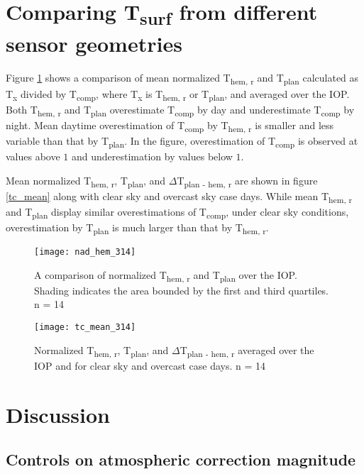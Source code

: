 \begin{bibunit}
\section{Comparing T\textsubscript{surf} from different sensor geometries}

Figure \ref{tc_nadhem} shows a comparison of mean normalized T\textsubscript{hem, r} and T\textsubscript{plan} calculated as T\textsubscript{x} divided by T\textsubscript{comp}, where T\textsubscript{x} is T\textsubscript{hem, r} or T\textsubscript{plan}, and averaged over the IOP. Both T\textsubscript{hem, r} and T\textsubscript{plan} overestimate T\textsubscript{comp} by day and underestimate T\textsubscript{comp} by night. Mean daytime overestimation of T\textsubscript{comp} by T\textsubscript{hem, r} is smaller and less variable than that by T\textsubscript{plan}. In the figure, overestimation of T\textsubscript{comp} is observed at values above $1$ and underestimation by values below $1$.

Mean normalized T\textsubscript{hem, r}, T\textsubscript{plan}, and $\Delta$T\textsubscript{plan - hem, r} are shown in figure \ref{tc_mean} along with clear sky and overcast sky case days. While mean T\textsubscript{hem, r} and T\textsubscript{plan} display similar overestimations of T\textsubscript{comp}, under clear sky conditions, overestimation by T\textsubscript{plan} is much larger than that by T\textsubscript{hem, r}.

\begin{figure}[H]
	\centering
	\texttt{[image: nad\_hem\_314]}
	\caption{A comparison of normalized T\textsubscript{hem, r} and T\textsubscript{plan} over the IOP. Shading indicates the area bounded by the first and third quartiles. n = 14}
	\label{tc_nadhem}
\end{figure}

\begin{figure}[H]
	\centering
	\texttt{[image: tc\_mean\_314]}
	\caption{Normalized T\textsubscript{hem, r}, T\textsubscript{plan}, and $\Delta$T\textsubscript{plan - hem, r} averaged over the IOP and for clear sky and overcast case days. n = 14}
	\label{tc_mean2}
\end{figure}

\section{Discussion}

\subsection{Controls on atmospheric correction magnitude}


\end{bibunit}
